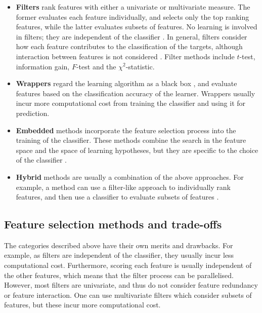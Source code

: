 \documentclass[12pt, twoside, a4paper]{report}
\begin{document}
\begin{itemize}
\item \textbf{Filters} rank features with either a univariate or multivariate measure. The former evaluates each feature individually, and selects only the top ranking features, while the latter evaluates subsets of features. No learning is involved in filters; they are independent of the classifier \cite{RefWorks:216}. In general, filters consider how each feature contributes to the classification of the targets, although interaction between features is not considered \cite{RefWorks:232}. Filter methods include $t$-test, information gain, $F$-test and the $\chi^2$-statistic.

\item \textbf{Wrappers} regard the learning algorithm as a black box \cite{RefWorks:140}, and evaluate features based on the classification accuracy of the learner. Wrappers usually incur more computational cost from training the classifier and using it for prediction.

\item \textbf{Embedded} methods incorporate the feature selection process into the training of the classifier. These methods combine the search in the feature space and the space of learning hypotheses, but they are specific to the choice of the classifier \cite{RefWorks:118}.

\item \textbf{Hybrid} methods are usually a combination of the above approaches. For example, a method can use a filter-like approach to individually rank features, and then use a classifier to evaluate subsets of features \cite{RefWorks:140}.

\end{itemize}

\subsection{Feature selection methods and trade-offs} \label{bg:fs:tradeoff}

The categories described above have their own merits and drawbacks. For example, as filters are independent of the classifier, they usually incur less computational cost. Furthermore, scoring each feature is usually independent of the other features, which means that the filter process can be parallelised. However, most filters are univariate, and thus do not consider feature redundancy or feature interaction. One can use multivariate filters which consider subsets of features, but these incur more computational cost.
\end{document}
